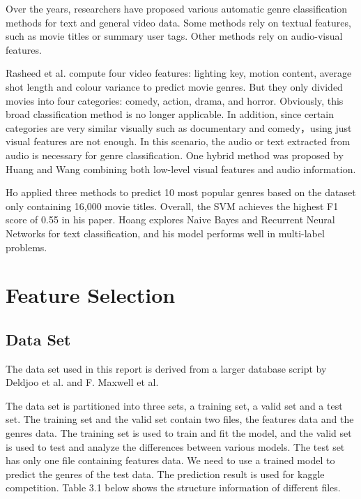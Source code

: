 \documentclass[11pt]{article}
\begin{document}
Over the years, researchers have proposed various automatic genre classification methods for text and general video data. Some methods rely on textual features, such as movie titles or summary user tags. Other methods rely on audio-visual features.

Rasheed et al. compute four video features: lighting key, motion content, average shot length and colour variance to predict movie genres. But they only divided movies into four categories: comedy, action, drama, and horror. Obviously, this broad classification method is no longer applicable. In addition, since certain categories are very similar visually such as documentary and comedy，using just visual features are not enough. In this scenario, the audio or text extracted from audio is necessary for genre classification. One hybrid method was proposed by Huang and Wang combining both low-level visual features and audio information.

Ho applied three methods to predict 10 most popular genres based on the dataset only containing 16,000 movie titles. Overall, the SVM achieves the highest F1 score of 0.55 in his paper. Hoang explores Naive Bayes and Recurrent Neural Networks for text classification, and his model performs well in multi-label problems.

\section{Feature Selection}

\subsection{Data Set}

The data set used in this report is derived from a larger database script by Deldjoo et al. and F. Maxwell et al.

The data set is partitioned into three sets, a training set, a valid set and a test set. The training set and the valid set contain two files, the features data and the genres data. The training set is used to train and fit the model, and the valid set is used to test and analyze the differences between various models. The test set has only one file containing features data. We need to use a trained model to predict the genres of the test data. The prediction result is used for kaggle competition. Table 3.1 below shows the structure information of different files.
\end{document}

